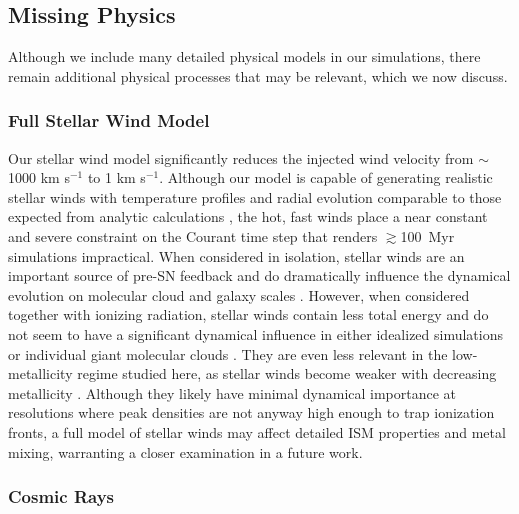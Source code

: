 \documentclass[twocolumn]{aastex61}
\begin{document}
\subsection{Missing Physics}
Although we include many detailed physical models in our simulations, there remain additional physical processes that may be relevant, which we now discuss.

\subsubsection{Full Stellar Wind Model}
\label{sec:stellar winds discussion}
Our stellar wind model significantly reduces the injected wind velocity from $\sim$1000 km s$^{-1}$ to 1 km s$^{-1}$. Although our model is capable of generating realistic stellar winds with temperature profiles and radial evolution comparable to those expected from analytic calculations \citep{Weaver1977}, the hot, fast winds place a near constant and severe constraint on the Courant time step that renders $\gtrsim$100~Myr simulations impractical. When considered in isolation, stellar winds are an important source of pre-SN feedback and do dramatically influence the dynamical evolution on molecular cloud and galaxy scales \citep{Dale2008,Peters2017,Gatto2017}. However, when considered together with ionizing radiation, stellar winds contain less total energy \citep{Agertz2013} and do not seem to have a significant dynamical influence in either idealized simulations \citep{Geen2015} or 
   individual giant molecular clouds
\citep{Dale2014}. They are even less relevant in the low-metallicity regime studied here, as stellar winds become weaker with decreasing metallicity \citep{Puls2000, Vink2005}. Although they likely have minimal dynamical importance
   at resolutions where peak densities are not anyway high enough to trap ionization 
   fronts, 
a full model of stellar winds may affect detailed ISM properties and metal mixing, warranting a closer examination in a future work.

\subsubsection{Cosmic Rays} 
\end{document}
